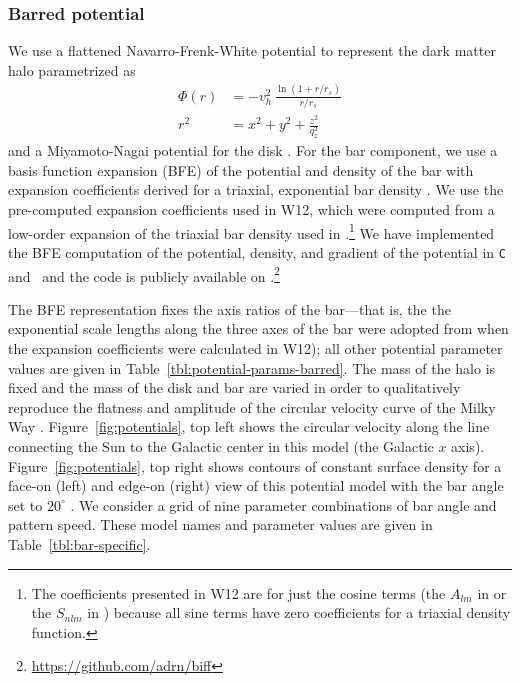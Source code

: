 \documentclass[letterpaper,12pt,preprint]{aastex}
\begin{document}
\subsubsection{Barred potential}
We use a flattened Navarro-Frenk-White potential to represent the dark matter halo \citep[e.g.,][]{kuepper15} parametrized as
\begin{align}
	\Phi(r) &= -v_h^2\,\frac{\ln{(1 + r/r_s)}}{r/r_s}\label{eq:flatnfw}\\
	r^2 &= x^2 + y^2 + \frac{z^2}{q_z^2}
\end{align}
and a Miyamoto-Nagai potential for the disk \citep{miyamoto75}. For the bar component, we use a basis function expansion (BFE) of the potential and density of the bar with expansion coefficients derived for a triaxial, exponential bar density \citep[][hereafter W12]{wang12}. We use the pre-computed expansion coefficients used in W12, which were computed from a low-order expansion of the triaxial bar density used in \citet{dwek95}.\footnote{The coefficients presented in W12 are for just the cosine terms (the $A_{lm}$ in \citet{hernquist92} or the $S_{nlm}$ in \citet{lowing11}) because all sine terms have zero coefficients for a triaxial density function.} We have implemented the BFE computation of the potential, density, and gradient of the potential in \texttt{C} and \python\ and the code is publicly available on \github.\footnote{\url{https://github.com/adrn/biff}} 

The BFE representation fixes the axis ratios of the bar---that is, the the exponential scale lengths along the three axes of the bar were adopted from \cite{dwek95} when the expansion coefficients were calculated in W12); all other potential parameter values are given in Table~\ref{tbl:potential-params-barred}. The mass of the halo is fixed and the mass of the disk and bar are varied in order to qualitatively reproduce the flatness and amplitude of the circular velocity curve of the Milky Way \citep{bovy12}. Figure~\ref{fig:potentials}, top left shows the circular velocity along the line connecting the Sun to the Galactic center in this model (the Galactic $x$ axis). Figure~\ref{fig:potentials}, top right shows contours of constant surface density for a face-on (left) and edge-on (right) view of this potential model with the bar angle set to $20^\circ$ \citep[compare to, e.g., Figure 3 in][]{portail15}. We consider a grid of nine parameter combinations of bar angle and pattern speed. These model names and parameter values are given in Table~\ref{tbl:bar-specific}.
\end{document}
